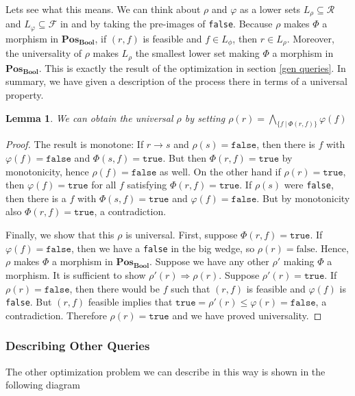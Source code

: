 \documentclass[12pt]{article}
\theoremstyle{definition}
\theoremstyle{plain}
\newtheorem{lemma}{Lemma}[section]
\theoremstyle{plain}
\theoremstyle{plain}
\theoremstyle{plain}
\theoremstyle{remark}
\theoremstyle{remark}
\newcommand{\mc}[1]{\mathcal{#1}}
\newcommand{\sub}{\subseteq}
\begin{document}
Lets see what this means. We can think about $\rho$ and $\varphi$ as a lower sets $L_\rho \sub \mc{R}$ and $L_\varphi \sub \mc{F}$ in and by taking the pre-images of \texttt{false}. Because $\rho$ makes $\Phi$ a morphism in $\mathbf{Pos_{Bool}}$, if $(r,f)$ is feasible and $f \in L_\phi$, then $r \in L_\rho$. Moreover, the universality of $\rho$ makes $L_\rho$ the smallest lower set making $\Phi$ a morphism in $\mathbf{Pos_{Bool}}$. This is exactly the result of the optimization in section \ref{gen queries}. In summary, we have given a description of the process there in terms of a universal property. 

\begin{lemma}
	We can obtain the universal $\rho$ by setting $\rho(r) = \bigwedge_{\{f \:|\: \Phi(r,f)\}} \varphi(f)$
\end{lemma}
\begin{proof}
	The result is monotone: If $r \rightarrow s$ and $\rho(s) = \mathtt{false}$, then there is $f$ with $\varphi(f) = \mathtt{false}$ and $\Phi(s,f) = \mathtt{true}$. But then $\Phi(r,f) = \mathtt{true}$ by monotonicity, hence $\rho(f) = \mathtt{false}$ as well. On the other hand if $\rho(r) = \mathtt{true}$, then $\varphi(f) = \mathtt{true}$ for all $f$ satisfying $\Phi(r,f) = \mathtt{true}$. If $\rho(s)$ were \texttt{false}, then there is a $f$ with $\Phi(s,f) = \mathtt{true}$ and $\varphi(f) = \mathtt{false}$. But by monotonicity also $\Phi(r,f) = \mathtt{true}$, a contradiction. 
	
	Finally, we show that this $\rho$ is universal. First, suppose $\Phi(r,f) = \mathtt{true}$. If $\varphi(f) = \mathtt{false}$, then we have a \texttt{false} in the big wedge, so $\rho(r) = \text{false}$. Hence, $\rho$ makes $\Phi$ a morphism in $\mathbf{Pos_{Bool}}$. Suppose we have any other $\rho'$ making $\Phi$ a morphism. It is sufficient to show $\rho'(r) \Rightarrow \rho(r)$. Suppose $\rho'(r) = \mathtt{true}$. If $\rho(r) = \mathtt{false}$, then there would be $f$ such that $(r,f)$ is feasible and $\varphi(f)$ is \texttt{false}. But $(r,f)$ feasible implies that $\mathtt{true} = \rho'(r) \leq \varphi(r) = \mathtt{false}$, a contradiction. Therefore $\rho(r) = \mathtt{true}$ and we have proved universality.
\end{proof}


\subsubsection{Describing Other Queries}
The other optimization problem we can describe in this way is shown in the following diagram
\end{document}
